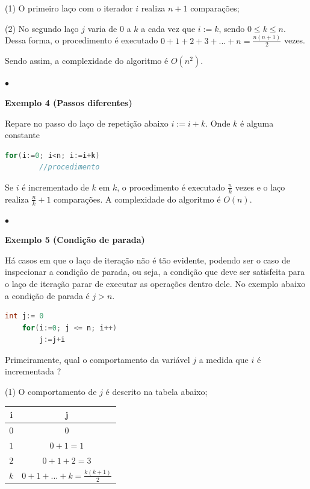 (1) O primeiro laço com o iterador $i$ realiza $n+1$ comparações;

(2) No segundo laço $j$ varia de $0$ a $k$ a cada vez que $i:=k$, sendo $0\leq k\leq n$. Dessa forma, o procedimento é executado $0+1+2+3+...+n = \frac{n(n+1)}{2}$ vezes.

Sendo assim, a complexidade do algoritmo é $O(n^2)$.

{\raggedleft $\bullet$ \par}

\textbf{Exemplo 4 (Passos diferentes)}

Repare no passo do laço de repetição abaixo $i:=i+k$. Onde $k$ é alguma constante

\begin{lstlisting}[language=C, frame=single]
    for(i:=0; i<n; i:=i+k)
        //procedimento
\end{lstlisting}

Se $i$ é incrementado de $k$ em $k$, o procedimento é executado $\frac{n}{k}$ vezes e o laço realiza $\frac{n}{k}+1$ comparações. A complexidade do algoritmo é $O(n)$.

{\raggedleft $\bullet$ \par}

\textbf{Exemplo 5 (Condição de parada)}

Há casos em que o laço de iteração não é tão evidente, podendo ser o caso de inspecionar a condição de parada, ou seja, a condição que deve ser satisfeita para o laço de iteração parar de executar as operações dentro dele. No exemplo abaixo a condição de parada é $j > n$.

\begin{lstlisting}[language=C, frame=single]
    int j:= 0
    for(i:=0; j <= n; i++)
        j:=j+i
\end{lstlisting}
Primeiramente, qual o comportamento da variável $j$ a medida que $i$ é incrementada ?

(1) O comportamento de $j$ é descrito na tabela abaixo;

\begin{table}[h]
  \centering
  \begin{tabular}{cc}
    \textbf{i} & \textbf{j} \\
    \hline
    $0$ &  $0$ \\
    $1$ &  $0+1 = 1$ \\
    $2$ & $0+1+2 = 3$ \\
    $k$ &  $0+1+...+k = \frac{k(k+1)}{2}$ \\
  \end{tabular}
\end{table}


